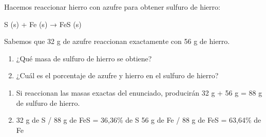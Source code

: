 \begin{exercise}
    Hacemos reaccionar hierro con azufre para obtener sulfuro de hierro:
    \begin{reaction*}
        S (s) + Fe (s) → FeS (s)
    \end{reaction*}
    Sabemos que 32 g de azufre reaccionan exactamente con
    56 g de hierro.
    \begin{enumerate}[label=\letraminuscula]
            \item ¿Qué masa de sulfuro de hierro se obtiene?
            \item ¿Cuál es el porcentaje de azufre y hierro en el
            sulfuro de hierro?
    \end{enumerate}
    \begin{solu}
        \begin{enumerate}[label=\letraminuscula]
                \item Si reaccionan las masas exactas del enunciado,
                producirán 32 g + 56 g = 88 g de sulfuro
                de hierro.
                \item 32 g de S / 88 g de FeS = 36,36\% de S
                56 g de Fe / 88 g de FeS = 63,64\% de Fe
        \end{enumerate}
    \end{solu}
\end{exercise}

